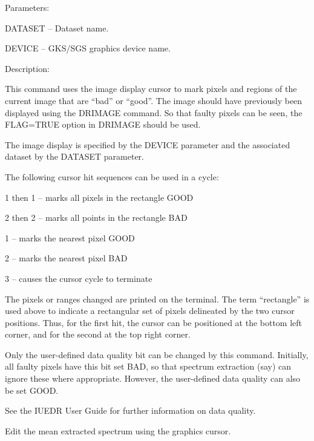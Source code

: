 \begin {description}
\begin {description}
\item Parameters:

\begin {description}
\item DATASET -- Dataset name.
\item DEVICE -- GKS/SGS graphics device name.
\end {description}

\item Description:

This command uses the image display cursor to mark pixels and
regions of the current image that are ``bad'' or ``good''.
The image should have previously been displayed using the
DRIMAGE command.
So that faulty pixels can be seen, the FLAG=TRUE option in DRIMAGE should be
used.

The image display is specified by the DEVICE parameter and the associated
dataset by the DATASET parameter.

The following cursor hit sequences can be used in a cycle:

\begin {description}
\item 1 then 1 -- marks all pixels in the rectangle GOOD
\item 2 then 2 -- marks all points in the rectangle BAD
\item 1 -- marks the nearest pixel GOOD
\item 2 -- marks the nearest pixel BAD
\item 3 -- causes the cursor cycle to terminate
\end {description}

The pixels or ranges changed are printed on the terminal.
The term ``rectangle'' is used above to indicate a rectangular
set of pixels delineated by the two cursor positions.
Thus, for the first hit, the cursor can be positioned at the
bottom left corner, and for the second at the top right corner.

Only the user-defined data quality bit can be changed by this
command.
Initially, all faulty pixels have this bit set BAD, so that
spectrum extraction (say) can ignore these where appropriate.
However, the user-defined data quality can also be set GOOD.

See the IUEDR User Guide for further information on data quality.
\end {description}

\item [EDMEAN]
Edit the mean extracted spectrum using the graphics cursor.


\end{description}
